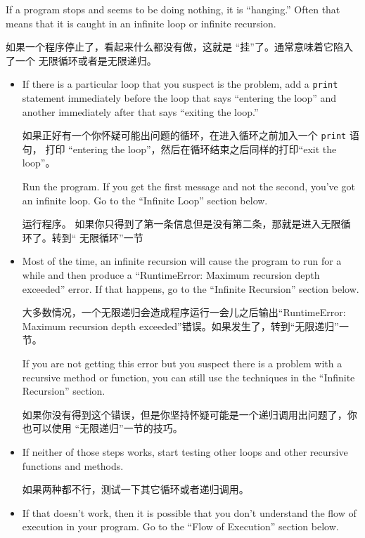 \documentclass[10pt]{book}
\begin{document}
\begin{CJK}{UTF8}{gbsn}
If a program stops and seems to be doing nothing, it is ``hanging.''
Often that means that it is caught in an infinite loop or infinite
recursion.

如果一个程序停止了，看起来什么都没有做，这就是 ``挂''了。通常意味着它陷入了一个
无限循环或者是无限递归。

\begin{itemize}

\item If there is a particular loop that you suspect is the
problem, add a {\tt print} statement immediately before the loop that says
``entering the loop'' and another immediately after that says
``exiting the loop.''

如果正好有一个你怀疑可能出问题的循环，在进入循环之前加入一个 {\tt print} 语句，
打印 ``entering the loop''，然后在循环结束之后同样的打印``exit the loop''。

Run the program.  If you get the first message and not the second,
you've got an infinite loop.  Go to the ``Infinite Loop'' section
below.

运行程序。 如果你只得到了第一条信息但是没有第二条，那就是进入无限循环了。转到``
无限循环''一节

\item Most of the time, an infinite recursion will cause the program
to run for a while and then produce a ``RuntimeError: Maximum
recursion depth exceeded'' error.  If that happens, go to the
``Infinite Recursion'' section below.

大多数情况，一个无限递归会造成程序运行一会儿之后输出``RuntimeError: Maximum
recursion depth exceeded''错误。如果发生了，转到``无限递归''一节。

If you are not getting this error but you suspect there is a problem
with a recursive method or function, you can still use the techniques
in the ``Infinite Recursion'' section.

如果你没有得到这个错误，但是你坚持怀疑可能是一个递归调用出问题了，你也可以使用
``无限递归''一节的技巧。

\item If neither of those steps works, start testing other
loops and other recursive functions and methods.

如果两种都不行，测试一下其它循环或者递归调用。

\item If that doesn't work, then it is possible that
you don't understand the flow of execution in your program.
Go to the ``Flow of Execution'' section below.


\end{itemize}
\end{CJK}
\end{document}
